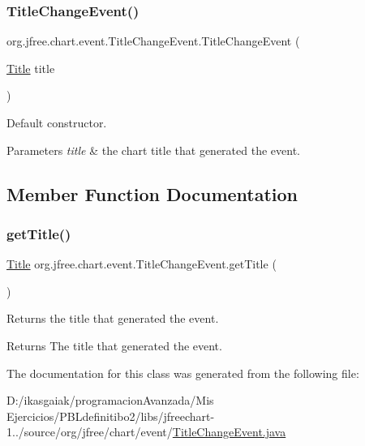 \subsubsection{\texorpdfstring{Title\+Change\+Event()}{TitleChangeEvent()}}
{\footnotesize\ttfamily org.\+jfree.\+chart.\+event.\+Title\+Change\+Event.\+Title\+Change\+Event (\begin{DoxyParamCaption}\item[{\mbox{\hyperlink{classorg_1_1jfree_1_1chart_1_1title_1_1_title}{Title}}}]{title }\end{DoxyParamCaption})}

Default constructor.


\begin{DoxyParams}{Parameters}
{\em title} & the chart title that generated the event. \\
\hline
\end{DoxyParams}


\subsection{Member Function Documentation}
\mbox{\label{classorg_1_1jfree_1_1chart_1_1event_1_1_title_change_event_ac5fe52d497b9d0a39e7164f0f6f08f5d}} 
\subsubsection{\texorpdfstring{get\+Title()}{getTitle()}}
{\footnotesize\ttfamily \mbox{\hyperlink{classorg_1_1jfree_1_1chart_1_1title_1_1_title}{Title}} org.\+jfree.\+chart.\+event.\+Title\+Change\+Event.\+get\+Title (\begin{DoxyParamCaption}{ }\end{DoxyParamCaption})}

Returns the title that generated the event.

\begin{DoxyReturn}{Returns}
The title that generated the event. 
\end{DoxyReturn}


The documentation for this class was generated from the following file\+:\begin{DoxyCompactItemize}
\item 
D\+:/ikasgaiak/programacion\+Avanzada/\+Mis Ejercicios/\+P\+B\+Ldefinitibo2/libs/jfreechart-\/1../source/org/jfree/chart/event/\mbox{\hyperlink{_title_change_event_8java}{Title\+Change\+Event.\+java}}\end{DoxyCompactItemize}
